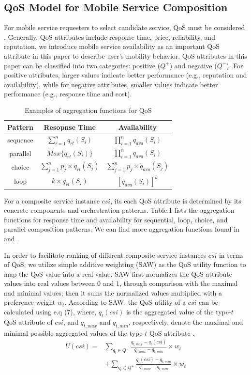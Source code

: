 \documentclass[10pt,journal,compsoc]{IEEEtran}
\begin{document}
\subsection{QoS Model for Mobile Service Composition}
For mobile service requesters to select candidate service, QoS must be considered \cite{Wu2016,luo2014efficient,luo2016generating}. Generally, QoS attributes include response time, price, reliability, and reputation, we introduce mobile service availability as an important QoS attribute in this paper to describe user's mobility behavior. QoS attributes in this paper can be classified into two categories: positive ($Q^+$) and negative ($Q^{-}$). For positive attributes, larger values indicate better performance (e.g., reputation and availability), while for negative attributes, smaller values indicate better performance (e.g., response time and cost).

\begin{table}[!t]
\renewcommand{\arraystretch}{1.3}
\caption{Examples of aggregation functions for QoS}
\label{table_example}
\centering
\begin{tabular}{ccc}
\hline
\bfseries Pattern & \bfseries Resopnse Time & \bfseries Availability \\
\hline
sequence & $\sum_{i=1}^{n}q_{rt}(S_i)$ & $\prod_{i=1}^{n}q_{ava}(S_i)$ \\
parallel & $Max\{q_{rt}(S_i)\}$ & $\prod_{i=1}^{n}q_{ava}(S_i)$ \\
choice & $\sum_{j=1}^{n} p_j \times q_{rt}(S_j)$ & $\sum_{j=1}^{n} p_j \times q_{ava}(S_j)$ \\
loop & $k \times q_{rt}(S_i)$ & $[q_{ava}(S_i)]^{k}$ \\
\hline
\end{tabular}
\end{table}

For a composite service instance $csi$, its each QoS attribute is determined by its concrete components and orchestration patterns. Table.1 lists the aggregation functions for response time and availability for sequential, loop, choice, and parallel composition patterns. We can find more aggregation functions found in \cite{jaeger2004qos} and \cite{zheng2013qos}.

In order to facilitate ranking of different composite service instances $csi$ in terms of QoS, we utilize simple additive weighting (SAW) as the QoS utility function to map the QoS value into a real value. SAW first normalizes the QoS attribute values into real values between $0$ and $1$, through comparison with the maximal and minimal values; then it sums the normalized values multiplied with a preference weight $w_t$. According to SAW, the QoS utility of a $csi$ can be calculated using e.q (7), where, $q_t(csi)$ is the aggregated value of the type-$t$ QoS attribute of $csi$, and $q_{t,max}$ and $q_{t,min}$, respectively, denote the maximal and minimal possible aggregated values of the type-$t$ QoS attribute \cite{Wu2016}.
\begin{align}
U(csi) = & \sum_{q_t \in Q^-} \frac{q_{t,max}-q_t(csi)}{q_{t,max}-q_{t,min}}\times w_t \\\nonumber
& +\sum_{q_t \in Q^+} \frac{q_t(csi)-q_{t,min}}{q_{t,max}-q_{t,min}}\times w_t
\end{align}
\end{document}

